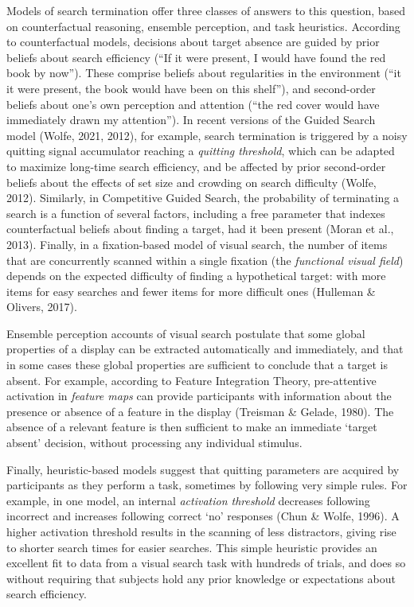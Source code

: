 \documentclass[12pt,twoside]{reedthesis}
\begin{document}
Models of search termination offer three classes of answers to this question, based on counterfactual reasoning, ensemble perception, and task heuristics. According to counterfactual models, decisions about target absence are guided by prior beliefs about search efficiency (``If it were present, I would have found the red book by now''). These comprise beliefs about regularities in the environment (``it it were present, the book would have been on this shelf''), and second-order beliefs about one's own perception and attention (``the red cover would have immediately drawn my attention''). In recent versions of the Guided Search model (Wolfe, 2021, 2012), for example, search termination is triggered by a noisy quitting signal accumulator reaching a \emph{quitting threshold}, which can be adapted to maximize long-time search efficiency, and be affected by prior second-order beliefs about the effects of set size and crowding on search difficulty (Wolfe, 2012). Similarly, in Competitive Guided Search, the probability of terminating a search is a function of several factors, including a free parameter that indexes counterfactual beliefs about finding a target, had it been present (Moran et al., 2013). Finally, in a fixation-based model of visual search, the number of items that are concurrently scanned within a single fixation (the \emph{functional visual field}) depends on the expected difficulty of finding a hypothetical target: with more items for easy searches and fewer items for more difficult ones (Hulleman \& Olivers, 2017).

Ensemble perception accounts of visual search postulate that some global properties of a display can be extracted automatically and immediately, and that in some cases these global properties are sufficient to conclude that a target is absent. For example, according to Feature Integration Theory, pre-attentive activation in \emph{feature maps} can provide participants with information about the presence or absence of a feature in the display (Treisman \& Gelade, 1980). The absence of a relevant feature is then sufficient to make an immediate `target absent' decision, without processing any individual stimulus.

Finally, heuristic-based models suggest that quitting parameters are acquired by participants as they perform a task, sometimes by following very simple rules. For example, in one model, an internal \emph{activation threshold} decreases following incorrect and increases following correct `no' responses (Chun \& Wolfe, 1996). A higher activation threshold results in the scanning of less distractors, giving rise to shorter search times for easier searches. This simple heuristic provides an excellent fit to data from a visual search task with hundreds of trials, and does so without requiring that subjects hold any prior knowledge or expectations about search efficiency.
\end{document}
